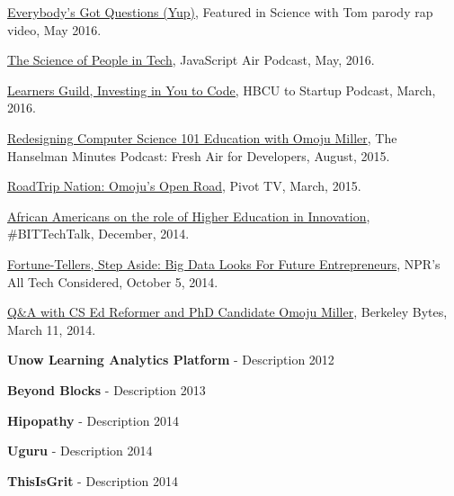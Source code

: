 \documentclass[11pt,article,oneside]{memoir}
\begin{document}
\ind \href{https://www.youtube.com/watch?v=q5mmE05e82I&ab_channel=ScienceWithTom}{Everybody's Got Questions (Yup)}, Featured in Science with Tom parody rap video, May 2016.

\ind \href{http://audio.javascriptair.com/e/022-jsair-the-science-of-people-in-tech-with-kate-edwards-omoju-miller-and-steve-andrews/}{The Science of People in Tech}, JavaScript Air Podcast, May, 2016.

\ind \href{https://www.youtube.com/watch?v=T0wQRr4RuqM&ab_channel=HBCUtoStartup}{Learners Guild, Investing in You to Code,} HBCU to Startup Podcast, March, 2016.

\ind \href{http://hanselminutes.com/488/redesigning-computer-science-101-education-with-omoju-miller}{Redesigning Computer Science 101 Education with Omoju Miller}, The Hanselman Minutes Podcast: Fresh Air for Developers, August, 2015.

\ind \href{http://roadtripnation.com/leader/omoju-miller}{RoadTrip Nation: Omoju's Open Road}, Pivot TV, March, 2015.

\ind \href{https://www.blacksintechnology.net/the-road-to-50-podcast-african-americans-on-the-role-of-higher-education-in-innovation/}{African Americans on the role of Higher Education in Innovation}, \#BITTechTalk, December, 2014.

\ind \href{http://www.npr.org/sections/alltechconsidered/2014/10/05/351851015/fortune-tellers-step-aside-big-data-looks-for-future-entrepreneurs}{Fortune-Tellers, Step Aside: Big Data Looks For Future Entrepreneurs}, NPR's  All Tech Considered, October 5, 2014.

\ind \href{http://best.berkeley.edu/2015/03/11/best-labber-in-berkeley-byte-qa-with-cs-ed-reformer-and-phd-candidate-omoju-miller/}{Q\&A with CS Ed Reformer and PhD Candidate Omoju Miller}, Berkeley Bytes, March 11, 2014.


\clearpage


\ind \textbf{Unow Learning Analytics Platform} - Description \hfill 2012

\ind \textbf{Beyond Blocks} - Description \hfill 2013

\ind \textbf{Hipopathy} - Description \hfill 2014

\ind \textbf{Uguru} - Description \hfill 2014

\ind \textbf{ThisIsGrit} - Description \hfill 2014
\end{document}
